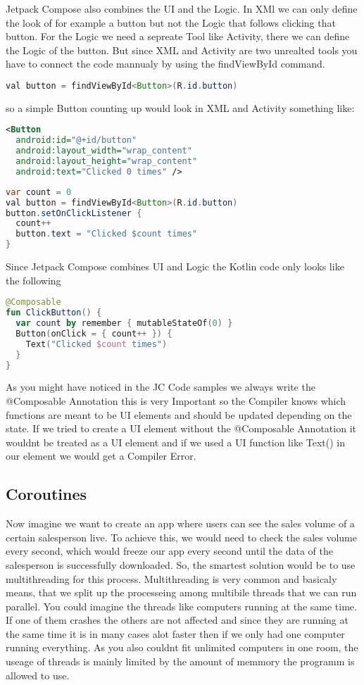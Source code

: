 \documentclass[a4paper,11pt]{article}
\begin{document}
Jetpack Compose also combines the UI and the Logic. In XMl we can only define the look of for example a button but not the Logic that  follows clicking that button. For the Logic we need a sepreate Tool like Activity, there we can define the Logic of the button. But since XML and Activity are two unrealted tools you have to connect the code mannualy by using the findViewById command.
\begin{lstlisting}[language = Java]
val button = findViewById<Button>(R.id.button)
\end{lstlisting}
so a simple Button counting up would look in XML and Activity something like:
\begin{lstlisting}[language=xml, title= {XML UI Button}]
<Button
  android:id="@+id/button"
  android:layout_width="wrap_content"
  android:layout_height="wrap_content"
  android:text="Clicked 0 times" />
\end{lstlisting}
\begin{lstlisting}[language=Java, title= {Activity Logic Button}]
var count = 0
val button = findViewById<Button>(R.id.button)
button.setOnClickListener {
  count++
  button.text = "Clicked $count times"
}
\end{lstlisting}

Since Jetpack Compose combines UI and Logic the Kotlin code only looks like the following
\begin{lstlisting}[language=Kotlin, title= {Jetpack Compose Button}]
@Composable
fun ClickButton() {
  var count by remember { mutableStateOf(0) }
  Button(onClick = { count++ }) {
    Text("Clicked $count times")
  }
}
\end{lstlisting}

As you might have noticed in the JC Code samples we always write the @Composable Annotation  this is very Important so the Compiler knows which functions are meant to be UI elements and should be updated depending on the state. %
If we tried to create a UI element without the @Composable Annotation it wouldnt be treated as a UI element and if we used a UI function like Text() in our element we would get a Compiler Error.

\subsection{Coroutines}
Now imagine we want to create an app where users can see the sales volume of a certain salesperson live. To achieve this, we would need to check the sales volume every second, which would freeze our app every second until the data of the salesperson is successfully downloaded. So, the smartest solution would be to use multithreading for this process. Multithreading is very common and basicaly means, that we split up the processeing among multibile threads that we can run parallel. You could imagine the threads like computers  running at the same time. If one of them crashes the others are not affected and since they are running at the same time it is in many cases alot faster then if we only had one computer running everything. As you also couldnt fit unlimited computers in one room, the useage of threads is mainly limited by the amount of memmory the programm is allowed to use.
\end{document}

